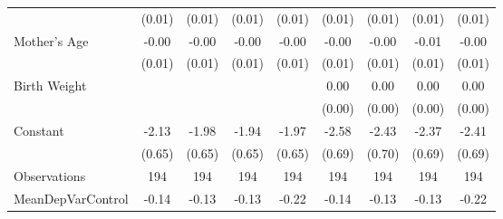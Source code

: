 {\begin{tabular}{l*{8}{c}}
                    &      (0.01)         &      (0.01)         &      (0.01)         &      (0.01)         &      (0.01)         &      (0.01)         &      (0.01)         &      (0.01)         \\
[1em]
Mother's Age        &       -0.00         &       -0.00         &       -0.00         &       -0.00         &       -0.00         &       -0.00         &       -0.01         &       -0.00         \\
                    &      (0.01)         &      (0.01)         &      (0.01)         &      (0.01)         &      (0.01)         &      (0.01)         &      (0.01)         &      (0.01)         \\
[1em]
Birth Weight        &                     &                     &                     &                     &        0.00\sym{*}  &        0.00         &        0.00         &        0.00         \\
                    &                     &                     &                     &                     &      (0.00)         &      (0.00)         &      (0.00)         &      (0.00)         \\
[1em]
Constant            &       -2.13\sym{***}&       -1.98\sym{***}&       -1.94\sym{***}&       -1.97\sym{***}&       -2.58\sym{***}&       -2.43\sym{***}&       -2.37\sym{***}&       -2.41\sym{***}\\
                    &      (0.65)         &      (0.65)         &      (0.65)         &      (0.65)         &      (0.69)         &      (0.70)         &      (0.69)         &      (0.69)         \\
\hline
Observations        &         194         &         194         &         194         &         194         &         194         &         194         &         194         &         194         \\
MeanDepVarControl   &       -0.14         &       -0.13         &       -0.13         &       -0.22         &       -0.14         &       -0.13         &       -0.13         &       -0.22         \\
\hline\hline
\end{tabular}
}
